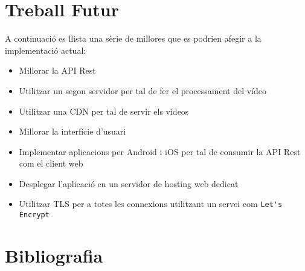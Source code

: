 \documentclass[12pt, titlepage]{article}
\begin{document}
\section{Treball Futur}

A continuació es llista una sèrie de millores que es podrien afegir a la implementació
actual:

\begin{itemize}
\item Millorar la API Rest
\item Utilitzar un segon servidor per tal de fer el processament del vídeo
\item Utilitzar una CDN per tal de servir els vídeos
\item Millorar la interfície d'usuari
\item Implementar aplicacions per Android i iOS per tal de consumir la API Rest com el client web
\item Desplegar l'aplicació en un servidor de hosting web dedicat
\item Utilitzar TLS per a totes les connexions utilitzant un servei com \verb|Let's Encrypt|
\end{itemize}

\section{Bibliografia}
\end{document}
